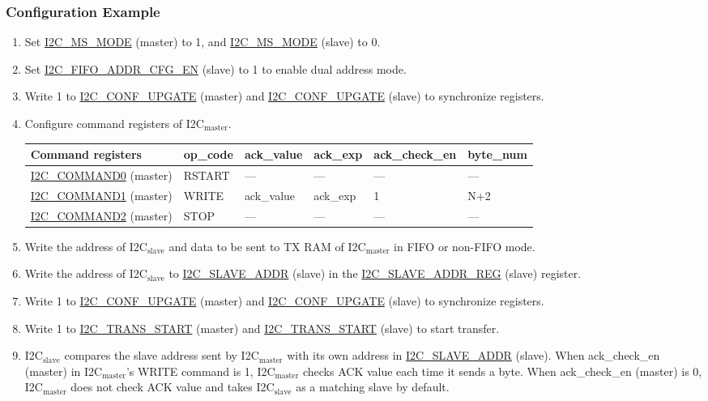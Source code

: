 \documentclass[main\_\_EN.tex]{subfiles}
\begin{document}
\subsubsection{Configuration Example}
\begin{enumerate}
\item Set \hyperref[fielddesc:I2CMSMODE]{I2C\_MS\_MODE} (master) to 1, and \hyperref[fielddesc:I2CMSMODE]{I2C\_MS\_MODE} (slave) to 0.
\item Set \hyperref[fielddesc:I2CFIFOADDRCFGEN]{I2C\_FIFO\_ADDR\_CFG\_EN} (slave) to 1 to enable dual address mode.
\item Write 1 to \hyperref[fielddesc:I2CCONFUPGATE]{I2C\_CONF\_UPGATE} (master) and \hyperref[fielddesc:I2CCONFUPGATE]{I2C\_CONF\_UPGATE} (slave) to synchronize registers.
\item Configure command registers of I2C$_\text{master}$.
\begin{longtable}{ | p{4cm} | p{2cm} | p{2cm} | p{2cm} |p{2cm} | p{2cm} |}
\hline\rowcolor{lightgray}
Command registers& op\_code & ack\_value&ack\_exp&ack\_check\_en&byte\_num  \\ \hline
\hyperref[fielddesc:I2CCOMMAND0]{I2C\_COMMAND0} (master)& RSTART& ---&---&---&---  \\ \hline
\hyperref[fielddesc:I2CCOMMAND1]{I2C\_COMMAND1} (master)& WRITE& ack\_value&ack\_exp&1&N+2  \\ \hline
\hyperref[fielddesc:I2CCOMMAND2]{I2C\_COMMAND2} (master)& STOP& ---&---&---&---  \\ \hline
\end{longtable}
\item Write the address of I2C$_\text{slave}$ and data to be sent to TX RAM of I2C$_\text{master}$ in FIFO or non-FIFO mode.
\item Write the address of I2C$_\text{slave}$ to \hyperref[fielddesc:I2CSLAVEADDR]{I2C\_SLAVE\_ADDR} (slave) in the \hyperref[regdesc:I2CSLAVEADDRREG]{I2C\_SLAVE\_ADDR\_REG} (slave) register.
\item Write 1 to \hyperref[fielddesc:I2CCONFUPGATE]{I2C\_CONF\_UPGATE} (master) and \hyperref[fielddesc:I2CCONFUPGATE]{I2C\_CONF\_UPGATE} (slave) to synchronize registers.
\item Write 1 to \hyperref[fielddesc:I2CTRANSSTART]{I2C\_TRANS\_START} (master) and \hyperref[fielddesc:I2CTRANSSTART]{I2C\_TRANS\_START} (slave) to start transfer.
\item I2C$_\text{slave}$ compares the slave address sent by I2C$_\text{master}$ with its own address in \hyperref[fielddesc:I2CSLAVEADDR]{I2C\_SLAVE\_ADDR} (slave). When ack\_check\_en (master) in I2C$_\text{master}$'s WRITE command is 1, I2C$_\text{master}$ checks ACK value each time it sends a byte. When ack\_check\_en (master) is 0, I2C$_\text{master}$ does not check ACK value and takes I2C$_\text{slave}$ as a matching slave by default.

\end{enumerate}
\end{document}

